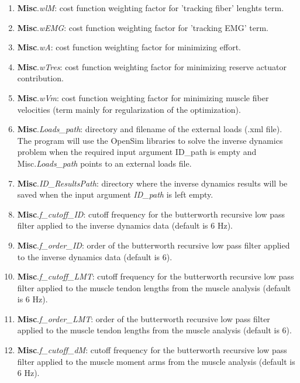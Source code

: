 \documentclass[a4paper,oneside,11pt]{article}
\begin{document}
\begin{enumerate}
	\item \textbf{Misc}.\textit{wlM}: cost function weighting factor for 'tracking fiber' lenghts term.

	\item \textbf{Misc}.\textit{wEMG}: cost function weighting factor for 'tracking EMG' term.
	
	\item \textbf{Misc}.\textit{wA}: cost function weighting factor for minimizing effort.
	
	\item \textbf{Misc}.\textit{wTres}: cost function weighting factor for minimizing reserve actuator contribution.

	\item \textbf{Misc}.\textit{wVm}: cost function weighting factor for minimizing muscle fiber velocities (term mainly for regularization of the optimization).
	
	\item \textbf{Misc}.\textit{Loads_path}: directory and filename of the external loads (.xml file). The program will use the OpenSim libraries to solve the inverse dynamics problem when the required input argument ID_path is empty and Misc.\textit{Loads_path} points to an external loads file.
	
	\item \textbf{Misc}.\textit{ID_ResultsPath}: directory where the inverse dynamics results will be saved when the input argument \textit{ID_path} is left empty.
	
	\item \textbf{Misc}.\textit{f_cutoff_ID}: cutoff frequency for the butterworth recursive low pass filter applied to the inverse dynamics data (default is 6 Hz).
	
	\item \textbf{Misc}.\textit{f_order_ID}: order of the butterworth recursive low pass filter applied to the inverse dynamics data (default is 6).
	
	\item \textbf{Misc}.\textit{f_cutoff_LMT}: cutoff frequency for the butterworth recursive low pass filter applied to the muscle tendon lengths from the muscle analysis (default is 6 Hz).
	
	\item \textbf{Misc}.\textit{f_order_LMT}: order of the butterworth recursive low pass filter applied to the muscle tendon lengths from the muscle analysis (default is 6).		
	
	\item \textbf{Misc}.\textit{f_cutoff_dM}: cutoff frequency for the butterworth recursive low pass filter applied to the muscle moment arms from the muscle analysis (default is 6 Hz).
	

\end{enumerate}
\end{document}
